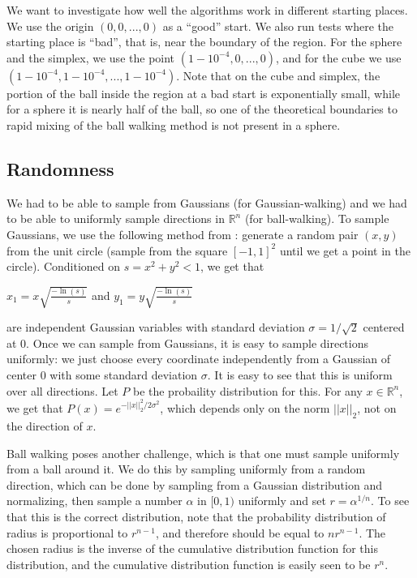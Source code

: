 \documentclass[11pt]{article}
\begin{document}
We want to investigate how well the algorithms work in different starting places. We use the origin $(0,0,...,0)$ as a ``good'' start. We also run tests where the starting place is ``bad'', that is, near the boundary of the region. For the sphere and the simplex, we use the point $(1 - 10^{-4}, 0, ..., 0)$, and for the cube we use $(1 - 10^{-4}, 1 - 10^{-4}, ..., 1 - 10^{-4})$. Note that on the cube and simplex, the portion of the ball inside the region at a bad start is exponentially small, while for a sphere it is nearly half of the ball, so one of the theoretical boundaries to rapid mixing of the ball walking method is not present in a sphere.

\subsection{Randomness}

We had to be able to sample from Gaussians (for Gaussian-walking) and we had to be able to uniformly sample directions in $\mathbb{R}^n$ (for ball-walking). To sample Gaussians, we use the following method from \cite{Marsaglia}: generate a random pair $(x,y)$ from the unit circle (sample from the square $[-1,1]^2$ until we get a point in the circle). Conditioned on $s = x^2 + y^2 < 1$, we get that
\begin{center}
$\displaystyle x_1 = x\sqrt{\frac{-\ln(s)}{s}}$ and $\displaystyle y_1 = y\sqrt{\frac{-\ln(s)}{s}}$
\end{center}
are independent Gaussian variables with standard deviation $\sigma = 1/\sqrt{2}$ centered at $0$. Once we can sample from Gaussians, it is easy to sample directions uniformly: we just choose every coordinate independently from a Gaussian of center $0$ with some standard deviation $\sigma$. It is easy to see that this is uniform over all directions. Let $P$ be the probaility distribution for this. For any $x\in\mathbb{R}^n$, we get that $P(x) = e^{-||x||_2^2 / 2\sigma^2}$, which depends only on the norm $||x||_2$, not on the direction of $x$.

Ball walking poses another challenge, which is that one must sample uniformly from a ball around it. We do this by sampling uniformly from a random direction, which can be done by sampling from a Gaussian distribution and normalizing, then sample a number $\alpha$ in $[0,1)$ uniformly and set $r = \alpha^{1/n}$. To see that this is the correct distribution, note that the probability distribution of radius is proportional to $r^{n-1}$, and therefore should be equal to $nr^{n-1}$. The chosen radius is the inverse of the cumulative distribution function for this distribution, and the cumulative distribution function is easily seen to be $r^n$.
\end{document}
